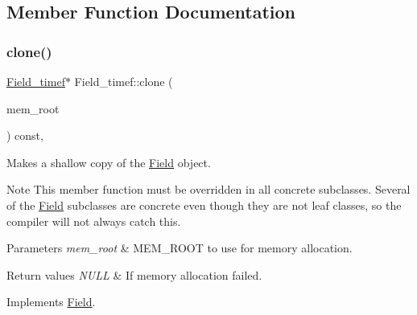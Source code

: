 \subsection{Member Function Documentation}
\mbox{\label{classField__timef_af4e77673fa7a018ffa0c31ce8b85b243}} 
\subsubsection{\texorpdfstring{clone()}{clone()}\hspace{0.1cm}{\footnotesize\ttfamily [1/2]}}
{\footnotesize\ttfamily \mbox{\hyperlink{classField__timef}{Field\+\_\+timef}}$\ast$ Field\+\_\+timef\+::clone (\begin{DoxyParamCaption}\item[{M\+E\+M\+\_\+\+R\+O\+OT $\ast$}]{mem\+\_\+root }\end{DoxyParamCaption}) const\hspace{0.3cm}{\ttfamily [inline]}, {\ttfamily [virtual]}}

Makes a shallow copy of the \mbox{\hyperlink{classField}{Field}} object.

\begin{DoxyNote}{Note}
This member function must be overridden in all concrete subclasses. Several of the \mbox{\hyperlink{classField}{Field}} subclasses are concrete even though they are not leaf classes, so the compiler will not always catch this.
\end{DoxyNote}

\begin{DoxyParams}{Parameters}
{\em mem\+\_\+root} & M\+E\+M\+\_\+\+R\+O\+OT to use for memory allocation. \\
\hline
\end{DoxyParams}

\begin{DoxyRetVals}{Return values}
{\em N\+U\+LL} & If memory allocation failed. \\
\hline
\end{DoxyRetVals}


Implements \mbox{\hyperlink{classField_a64979bcb9345803b031fff76a0c3d9fe}{Field}}.

\mbox{\label{classField__timef_a88b9adbc0663936c630f04f5567fae06}} 
